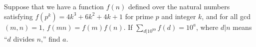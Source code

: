 Suppose that we have a function $f(n)$ defined over the natural numbers satisfying $f(p^k) = 4k^3 +6k^2 + 4k + 1$ for prime $p$ and integer $k$, and for all gcd$(m, n) = 1$, $f(mn) = f(m)f(n)$. If $\sum_{d|10^{99}} f(d) = 10^a$, where $d|n$ means ``$d$ divides $n$,'' find $a$.
